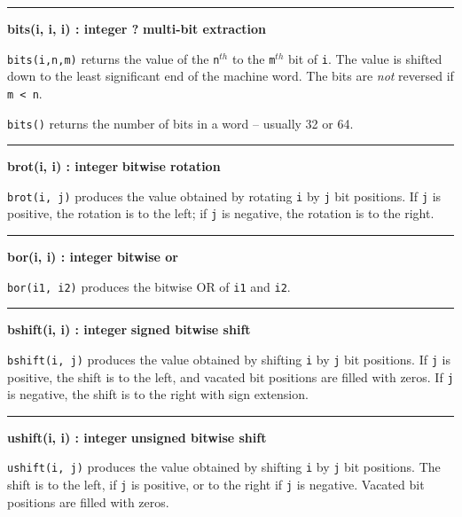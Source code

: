 \bigskip\hrule\vspace{0.1cm}
\noindent
{\bf bits(i, i, i) : integer ? } \hfill {\bf multi-bit extraction}

\noindent
\texttt{bits(i,n,m)} returns the value of the \texttt{n}$^{th}$ to the
\texttt{m}$^{th}$ bit of \texttt{i}. The value is shifted down to the
least significant end of the machine word. The bits are {\em not\/} reversed if
\verb|m < n|.

\noindent \texttt{bits()} returns the number of bits in a word -- usually 32 or 64.

\bigskip\hrule\vspace{0.1cm}
\noindent
{\bf brot(i, i) : integer } \hfill {\bf bitwise rotation}

\noindent
{}\texttt{brot(i, j)} produces the value obtained by
rotating \texttt{i} by \texttt{j} bit positions.
If \texttt{j} is positive, the rotation is to the left;
if \texttt{j} is negative, the rotation is to the right.

\bigskip\hrule\vspace{0.1cm}
\noindent
{\bf bor(i, i) : integer } \hfill {\bf bitwise or}

\noindent
{}\texttt{bor(i1, i2)} produces the bitwise OR of
\texttt{i1} and \texttt{i2}.

\bigskip\hrule\vspace{0.1cm}
\noindent
{\bf bshift(i, i) : integer } \hfill {\bf signed bitwise shift}

\noindent
{}\texttt{bshift(i, j)} produces the value obtained by
shifting \texttt{i} by \texttt{j} bit positions.
If \texttt{j} is positive, the shift is to the left, and vacated bit
positions are filled with zeros.
If \texttt{j} is negative, the shift is to the right with sign extension.

\bigskip\hrule\vspace{0.1cm}
\noindent
{\bf ushift(i, i) : integer } \hfill {\bf unsigned bitwise shift}

\noindent
{}\texttt{ushift(i, j)} produces the value obtained by
shifting \texttt{i} by \texttt{j} bit positions.
The shift is to the left, if \texttt{j} is positive, or to the right if
\texttt{j} is negative.  Vacated bit positions are filled with zeros.

